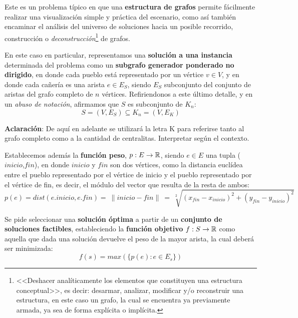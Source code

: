 \documentclass[11pt, a4paper, twoside]{article}
\begin{document}
{}


Este es un problema típico en que una \textbf{estructura de grafos} permite fácilmente realizar una visualización simple y práctica del escenario, como así también encaminar el análisis del universo de soluciones hacia un posible recorrido, construcción o \emph{deconstrucción}\footnote{<<Deshacer analíticamente los elementos que constituyen una estructura conceptual>>, es decir: desarmar, analizar, modificar y/o reconstruir una estructura, en este caso un grafo, la cual se encuentra ya previamente armada, ya sea de forma explícita o implícita.} de grafos.

En este caso en particular, representamos una \textbf{solución a una instancia} determinada del
problema como un \textbf{subgrafo generador ponderado no dirigido}, en donde cada pueblo está
representado por un vértice $v \in V$, y en donde cada cañería es una arista $e \in E_{S}$, siendo
$E_{S}$ subconjunto del conjunto de aristas del grafo completo de $n$ vértices. Refiriendonos a este
último detalle, y en un \emph{abuso de notación}, afirmamos que $S$ es subconjunto de $K_{n}$:
%
    \[
    S = (V,E_{S}) \subseteq K_{n} = (V,E_{K})
    \]
%

\textbf{Aclaración}: De aquí en adelante se utilizará la letra K para referirse tanto al grafo
completo como a la cantidad de centralitas. Interpretar según el contexto.


Establecemos además la \textbf{función peso}, $p: E \rightarrow \mathbb{R}$, siendo $e \in E$ una tupla
($inicio$,$fin$), en donde $inicio$ y $fin$ son dos vértices, como la distancia euclídea entre el
pueblo representado por el vértice de inicio y el pueblo representado por el vértice de fin, es
decir, el módulo del vector que resulta de la resta de ambos:
%
\[
  p(e) = dist(e.inicio, e.fin) =~\parallel inicio - fin \parallel ~=~ \sqrt[2]{(x_{fin}-x_{inicio})^{2}+(y_{fin}-y_{inicio})^{2}}
\]

\label{ej2-funcionobjetivo}

Se pide seleccionar una \textbf{solución óptima} a partir de un \textbf{conjunto de soluciones
factibles}, estableciendo la \textbf{función objetivo} $f: S \rightarrow \mathbb{R}$ como aquella que
dada una solución devuelve el peso de la mayor arista, la cual deberá ser minimizada:
%
\[
f(s) = max(\{p(e) : e \in E_{s}\})
\]
\end{document}

